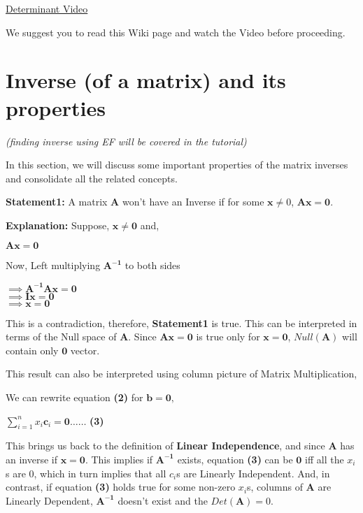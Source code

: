 \documentclass[a4paper]{article}
\begin{document}
\href{https://www.youtube.com/watch?v=Ip3X9LOh2dk}{Determinant Video}

We suggest you to read this Wiki page and watch the Video before proceeding.


\newpage
\section{Inverse (of a matrix) and its properties}
\textit{(finding inverse using EF will be covered in the tutorial)}

In this section, we will discuss some important properties of the matrix inverses and consolidate all the related concepts.

\textbf{Statement1: } A matrix \textbf{A} won't have an Inverse if for some $\mathbf{x}\neq0$, $\mathbf{Ax} = \mathbf{0}$.

\textbf{Explanation: } Suppose, $\mathbf{x}\neq\mathbf{0}$ and, 
\begin{center}
    $\mathbf{Ax} = \mathbf{0}$    
\end{center}
Now, Left multiplying $\mathbf{A^{-1}}$ to both sides

\begin{center}
    $\implies \mathbf{A^{-1}Ax} = \mathbf{0}$\\
    $\implies \mathbf{Ix} = \mathbf{0}$\\
    $\implies \mathbf{x} = \mathbf{0}$
\end{center}
This is a contradiction, therefore, \textbf{Statement1} is true. This can be interpreted in terms of the Null space of $\mathbf{A}$. Since $\mathbf{Ax} = \mathbf{0}$ is true only for $\mathbf{x} = \mathbf{0}$, $Null(\mathbf{A})$  will contain only $\mathbf{0}$ vector.

This result can also be interpreted using column picture of Matrix Multiplication,

We can rewrite equation \textbf{(2)} for $\mathbf{b} = \mathbf{0},$
\begin{center}
    $
    \displaystyle\sum_{i=1}^{n}x_i\textbf{c}_i = \textbf{0} \dots\dots
    $
    \textbf{(3)}
\end{center}

This brings us back to the definition of \textbf{Linear Independence}, and since $\mathbf{A}$ has an inverse if $\mathbf{x} = \mathbf{0}$. This implies if $\mathbf{A^{-1}}$ exists, equation \textbf{(3)} can be $\mathbf{0}$ iff all the $x_i$s are $0$, which in turn implies that all $c_i$s are Linearly Independent. And, in contrast, if equation \textbf{(3)} holds true for some non-zero $x_i$s, columns of $\mathbf{A}$ are Linearly Dependent, $\mathbf{A^{-1}}$ doesn't exist and the $Det(\mathbf{A}) = 0$.
\end{document}

